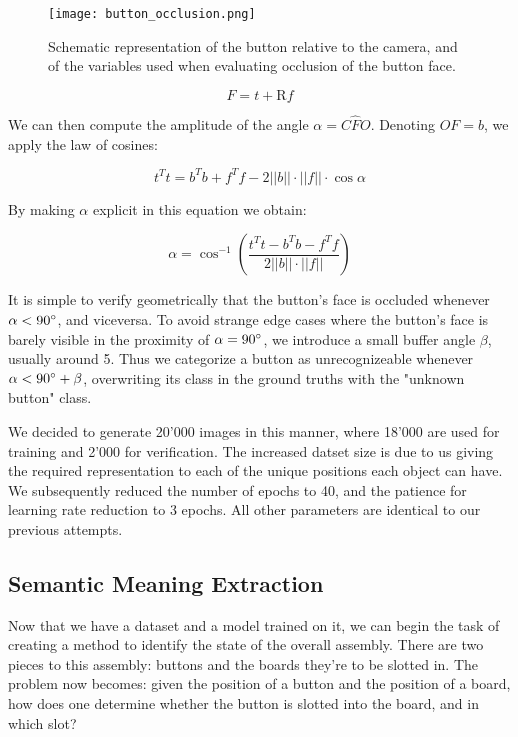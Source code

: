 \begin{figure}
    \texttt{[image: button\_occlusion.png]}
    \caption{Schematic representation of the button relative to the camera, and of the variables used when evaluating occlusion of the button face.}
    \label{fig:button_occlusion}
\end{figure}

\begin{equation*}
    F = t + \text{R}f
\end{equation*}

We can then compute the amplitude of the angle $\alpha = C\hat{F}O$. Denoting $OF=b$, we apply the law of cosines:

\begin{equation*}
    t^Tt = b^Tb + f^Tf -  2||b||\cdot ||f|| \cdot \cos \alpha
\end{equation*}

By making $\alpha$ explicit in this equation we obtain:

\begin{equation*}
    \alpha = \cos^{-1}\left(\frac{t^Tt- b^Tb-f^Tf}{2||b||\cdot||f||}\right)
\end{equation*}

It is simple to verify geometrically that the button's face is occluded whenever $\alpha < 90\degree$, and viceversa. To avoid strange edge cases where the button's face is barely visible in the proximity of $\alpha = 90\degree$, we introduce a small buffer angle $\beta$, usually around 5\degree. Thus we categorize a button as unrecognizeable whenever $\alpha < 90\degree + \beta$, overwriting its class in the ground truths with the "unknown button" class.

We decided to generate 20'000 images in this manner, where 18'000 are used for training and 2'000 for verification. The increased datset size is due to us giving the required representation to each of the unique positions each object can have. We subsequently reduced the number of epochs to 40, and the patience for learning rate reduction to 3 epochs. All other parameters are identical to our previous attempts.

\subsection{Semantic Meaning Extraction}

Now that we have a dataset and a model trained on it, we can begin the task of creating a method to identify the state of the overall assembly. There are two pieces to this assembly: buttons and the boards they're to be slotted in. The problem now becomes: given the position of a button and the position of a board, how does one determine whether the button is slotted into the board, and in which slot?

